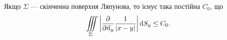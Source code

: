 \begin{theorem}
	\label{th:4.8.5}
	Якщо $\Sigma$ --- скінченна поверхня Ляпунова, то існує така постійна $C_0$, що
	\begin{equation}
		\label{eq:4.8.61}
		\displaystyle\iiint\limits_\Sigma \left| \frac{\partial}{\partial \vec n_y} \frac{1}{|x - y|} \right| \mathop{}\!\mathrm{d} S_y \le C_0.
	\end{equation}
\end{theorem}